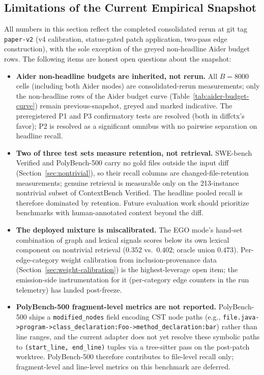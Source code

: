 \documentclass[11pt, a4paper]{article}
\begin{document}
\subsection{Limitations of the Current Empirical Snapshot}
\label{sec:limitations}

All numbers in this section reflect the completed consolidated rerun at git tag \texttt{paper-v2} (v4 calibration, status-gated patch application, two-pass edge construction), with the sole exception of the greyed non-headline Aider budget rows. The following items are honest open questions about the snapshot:

\begin{itemize}
    \item \textbf{Aider non-headline budgets are inherited, not rerun.} All $B{=}8000$ cells (including both Aider modes) are consolidated-rerun measurements; only the non-headline rows of the Aider budget curve (Table~\ref{tab:aider-budget-curve}) remain previous-snapshot, greyed and marked indicative. The preregistered P1 and P3 confirmatory tests are resolved (both in diffctx's favor); P2 is resolved as a significant omnibus with no pairwise separation on headline recall.
    \item \textbf{Two of three test sets measure retention, not retrieval.} SWE-bench Verified and PolyBench-500 carry no gold files outside the input diff (Section~\ref{sec:nontrivial}), so their recall columns are changed-file-retention measurements; genuine retrieval is measurable only on the 213-instance nontrivial subset of ContextBench Verified. The headline pooled recall is therefore dominated by retention. Future evaluation work should prioritize benchmarks with human-annotated context beyond the diff.
    \item \textbf{The deployed mixture is miscalibrated.} The EGO mode's hand-set combination of graph and lexical signals scores below its own lexical component on nontrivial retrieval ($0.352$ vs.\ $0.402$; oracle union $0.473$). Per-edge-category weight calibration from inclusion-provenance data (Section~\ref{sec:weight-calibration}) is the highest-leverage open item; the emission-side instrumentation for it (per-category edge counters in the run telemetry) has landed post-freeze.
    \item \textbf{PolyBench-500 fragment-level metrics are not reported.} PolyBench-500 ships a \texttt{modified\_nodes} field encoding CST node paths (e.g., \texttt{file.java->program->class\_declaration:Foo->method\_declaration:bar}) rather than line ranges, and the current adapter does not yet resolve these symbolic paths to \texttt{(start\_line, end\_line)} tuples via a tree-sitter pass on the post-patch worktree. PolyBench-500 therefore contributes to file-level recall only; fragment-level and line-level metrics on this benchmark are deferred.

\end{itemize}
\end{document}
